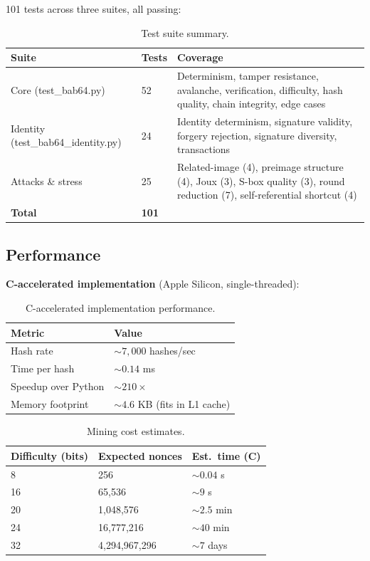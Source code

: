 \documentclass[preprint]{iacrtrans}
\begin{document}
101 tests across three suites, all passing:

\begin{table}[h]
\centering
\small
\begin{tabular}{@{}llp{5.5cm}@{}}
\toprule
\textbf{Suite} & \textbf{Tests} & \textbf{Coverage} \\
\midrule
Core (test\_bab64.py) & 52 & Determinism, tamper resistance, avalanche, verification, difficulty, hash quality, chain integrity, edge cases \\
Identity (test\_bab64\_identity.py) & 24 & Identity determinism, signature validity, forgery rejection, signature diversity, transactions \\
Attacks \& stress & 25 & Related-image (4), preimage structure (4), Joux (3), S-box quality (3), round reduction (7), self-referential shortcut (4) \\
\midrule
\textbf{Total} & \textbf{101} & \\
\bottomrule
\end{tabular}
\caption{Test suite summary.}
\end{table}

\subsection{Performance}

\textbf{C-accelerated implementation} (Apple Silicon, single-threaded):

\begin{table}[h]
\centering
\begin{tabular}{@{}ll@{}}
\toprule
\textbf{Metric} & \textbf{Value} \\
\midrule
Hash rate & ${\sim}7{,}000$ hashes/sec \\
Time per hash & ${\sim}0.14$ ms \\
Speedup over Python & ${\sim}210\times$ \\
Memory footprint & ${\sim}4.6$ KB (fits in L1 cache) \\
\bottomrule
\end{tabular}
\caption{C-accelerated implementation performance.}
\end{table}

\begin{table}[h]
\centering
\begin{tabular}{@{}lll@{}}
\toprule
\textbf{Difficulty (bits)} & \textbf{Expected nonces} & \textbf{Est.\ time (C)} \\
\midrule
8 & 256 & ${\sim}0.04$ s \\
16 & 65{,}536 & ${\sim}9$ s \\
20 & 1{,}048{,}576 & ${\sim}2.5$ min \\
24 & 16{,}777{,}216 & ${\sim}40$ min \\
32 & 4{,}294{,}967{,}296 & ${\sim}7$ days \\
\bottomrule
\end{tabular}
\caption{Mining cost estimates.}
\end{table}
\end{document}
